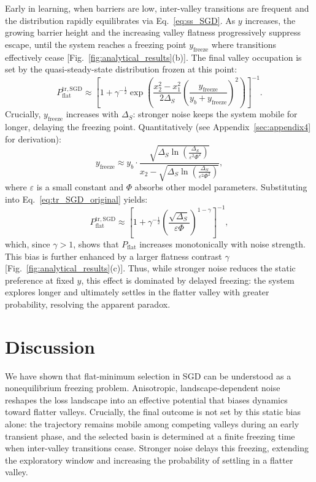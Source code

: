 \documentclass[aps,prx,reprint,superscriptaddress,longbibliography,nofootinbib,floatfix]{revtex4-2}
\begin{document}
Early in learning, when barriers are low, inter-valley transitions are frequent and the distribution rapidly equilibrates via Eq.~\ref{eq:ss_SGD}. As $y$ increases, the growing barrier height and the increasing valley flatness progressively suppress escape, until the system reaches a freezing point $y_{\mathrm{freeze}}$ where transitions effectively cease [Fig.~\ref{fig:analytical_results}(b)]. The final valley occupation is set by the quasi-steady-state distribution frozen at this point:
\begin{equation}
P_{\mathrm{flat}}^{\mathrm{tr,SGD}} \approx
\left[1+\gamma^{-\frac{1}{2}}
\exp\!\left(\frac{x_2^2-x_1^2}{2 \Delta_S}
\left(\frac{y_\mathrm{freeze}}{y_b+y_\mathrm{freeze}}\right)^2\right)\right]^{-1}.
\label{eq:tr_SGD_original}
\end{equation}
Crucially, $y_\mathrm{freeze}$ increases with $\Delta_S$: stronger noise keeps the system mobile for longer, delaying the freezing point. Quantitatively (see Appendix~\ref{sec:appendix4} for derivation):
\begin{equation}
y_\mathrm{freeze} \approx y_b \cdot \frac{\sqrt{\Delta_S \ln\left( \frac{\Delta_S}{\varepsilon^2 \Phi^2} \right)}}{x_2 - \sqrt{\Delta_S \ln\left( \frac{\Delta_S}{\varepsilon^2 \Phi^2} \right)}},
\label{eq:y_freeze}
\end{equation}
where $\varepsilon$ is a small constant and $\Phi$ absorbs other model parameters. Substituting into Eq.~\ref{eq:tr_SGD_original} yields:
\begin{equation}
P_{\mathrm{flat}}^{\mathrm{tr,SGD}} \approx \left[ 1 + \gamma^{-\frac{1}{2}} \left( \frac{\sqrt{\Delta_S}}{\varepsilon \Phi} \right)^{1-\gamma} \right]^{-1},
\label{eq:tr_SGD}
\end{equation}
which, since $\gamma > 1$, shows that $P_{\mathrm{flat}}$ increases monotonically with noise strength. This bias is further enhanced by a larger flatness contrast $\gamma$ [Fig.~\ref{fig:analytical_results}(c)]. Thus, while stronger noise reduces the static preference at fixed $y$, this effect is dominated by delayed freezing: the system explores longer and ultimately settles in the flatter valley with greater probability, resolving the apparent paradox.



\section{Discussion}
We have shown that flat-minimum selection in SGD can be understood as a nonequilibrium freezing problem. Anisotropic, landscape-dependent noise reshapes the loss landscape into an effective potential that biases dynamics toward flatter valleys. Crucially, the final outcome is not set by this static bias alone: the trajectory remains mobile among competing valleys during an early transient phase, and the selected basin is determined at a finite freezing time when inter-valley transitions cease. Stronger noise delays this freezing, extending the exploratory window and increasing the probability of settling in a flatter valley.
\end{document}
